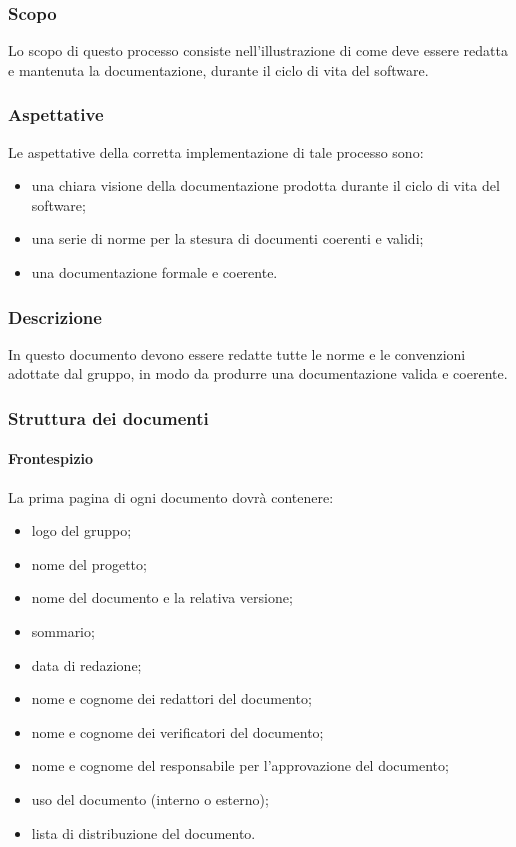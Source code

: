 \subsubsection{Scopo}
Lo scopo di questo processo consiste nell'illustrazione di come deve essere redatta e mantenuta
la documentazione, durante il ciclo di vita del software.
\subsubsection{Aspettative}
Le aspettative della corretta implementazione di tale processo sono:
\begin{itemize}
	\item una chiara visione della documentazione prodotta durante il ciclo di vita
del software;
	\item una serie di norme per la stesura di documenti coerenti e validi;
	\item una documentazione formale e coerente.
\end{itemize}
\subsubsection{Descrizione}
In questo documento devono essere redatte tutte le norme e le convenzioni adottate dal gruppo,
in modo da produrre una documentazione valida e coerente.
\subsubsection{Struttura dei documenti}
 \paragraph{Frontespizio}
La prima pagina di ogni documento dovrà contenere:
\begin{itemize}
	\item logo del gruppo;
	\item nome del progetto;
	\item nome del documento e la relativa versione;
	\item sommario;
	\item data di redazione;
	\item nome e cognome dei redattori del documento;
	\item nome e cognome dei verificatori del documento;
	\item nome e cognome del responsabile per l'approvazione del documento;
	\item uso del documento (interno o esterno);
	\item lista di distribuzione del documento.
\end{itemize}
